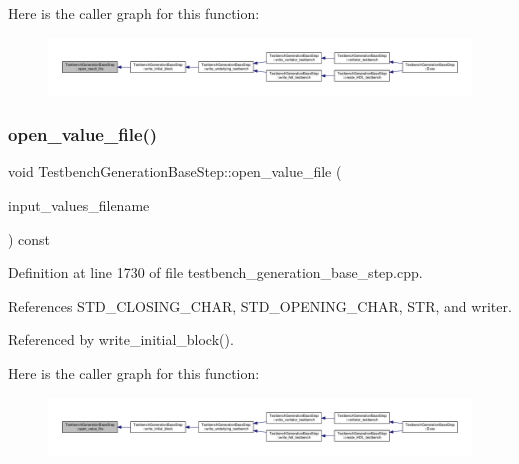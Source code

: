 Here is the caller graph for this function\+:
\nopagebreak
\begin{figure}[H]
\begin{center}
\leavevmode
\includegraphics[width=350pt]{dc/d02/classTestbenchGenerationBaseStep_a4fe34404d8fb60195bcc552a79e8533a_icgraph}
\end{center}
\end{figure}
\mbox{\label{classTestbenchGenerationBaseStep_a158e54657d84eef9c436e3f8e724ba19}} 
\subsubsection{\texorpdfstring{open\+\_\+value\+\_\+file()}{open\_value\_file()}}
{\footnotesize\ttfamily void Testbench\+Generation\+Base\+Step\+::open\+\_\+value\+\_\+file (\begin{DoxyParamCaption}\item[{const std\+::string \&}]{input\+\_\+values\+\_\+filename }\end{DoxyParamCaption}) const\hspace{0.3cm}{\ttfamily [protected]}}



Definition at line 1730 of file testbench\+\_\+generation\+\_\+base\+\_\+step.\+cpp.



References S\+T\+D\+\_\+\+C\+L\+O\+S\+I\+N\+G\+\_\+\+C\+H\+AR, S\+T\+D\+\_\+\+O\+P\+E\+N\+I\+N\+G\+\_\+\+C\+H\+AR, S\+TR, and writer.



Referenced by write\+\_\+initial\+\_\+block().

Here is the caller graph for this function\+:
\nopagebreak
\begin{figure}[H]
\begin{center}
\leavevmode
\includegraphics[width=350pt]{dc/d02/classTestbenchGenerationBaseStep_a158e54657d84eef9c436e3f8e724ba19_icgraph}
\end{center}
\end{figure}
\mbox{\label{classTestbenchGenerationBaseStep_a65bdf2b170262882a4f5f3b07a0c9ed8}} 
